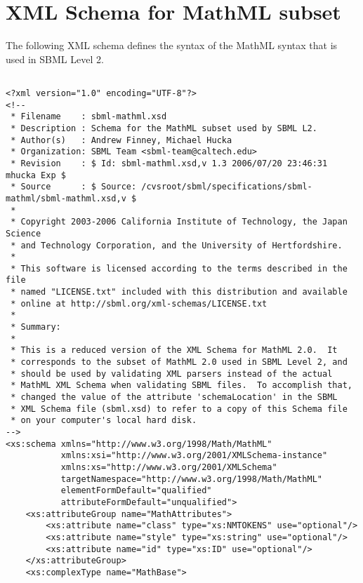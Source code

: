 
\section{XML Schema for MathML subset}
\label{apdx:mathml-subset-schema}

The following XML schema defines the syntax of the MathML syntax
that is used in SBML Level 2.

\begin{footnotesize}
\tightspacing
\begin{verbatim}

<?xml version="1.0" encoding="UTF-8"?>
<!--
 * Filename    : sbml-mathml.xsd
 * Description : Schema for the MathML subset used by SBML L2.
 * Author(s)   : Andrew Finney, Michael Hucka
 * Organization: SBML Team <sbml-team@caltech.edu>
 * Revision    : $ Id: sbml-mathml.xsd,v 1.3 2006/07/20 23:46:31 mhucka Exp $
 * Source      : $ Source: /cvsroot/sbml/specifications/sbml-mathml/sbml-mathml.xsd,v $
 *
 * Copyright 2003-2006 California Institute of Technology, the Japan Science
 * and Technology Corporation, and the University of Hertfordshire.
 *
 * This software is licensed according to the terms described in the file
 * named "LICENSE.txt" included with this distribution and available
 * online at http://sbml.org/xml-schemas/LICENSE.txt
 *
 * Summary:
 * 
 * This is a reduced version of the XML Schema for MathML 2.0.  It 
 * corresponds to the subset of MathML 2.0 used in SBML Level 2, and
 * should be used by validating XML parsers instead of the actual
 * MathML XML Schema when validating SBML files.  To accomplish that,
 * changed the value of the attribute 'schemaLocation' in the SBML
 * XML Schema file (sbml.xsd) to refer to a copy of this Schema file
 * on your computer's local hard disk.
-->
<xs:schema xmlns="http://www.w3.org/1998/Math/MathML" 
           xmlns:xsi="http://www.w3.org/2001/XMLSchema-instance" 
           xmlns:xs="http://www.w3.org/2001/XMLSchema" 
           targetNamespace="http://www.w3.org/1998/Math/MathML" 
           elementFormDefault="qualified" 
           attributeFormDefault="unqualified">
    <xs:attributeGroup name="MathAttributes">
        <xs:attribute name="class" type="xs:NMTOKENS" use="optional"/>
        <xs:attribute name="style" type="xs:string" use="optional"/>
        <xs:attribute name="id" type="xs:ID" use="optional"/>
    </xs:attributeGroup>
    <xs:complexType name="MathBase">

\end{verbatim}
\end{footnotesize}

